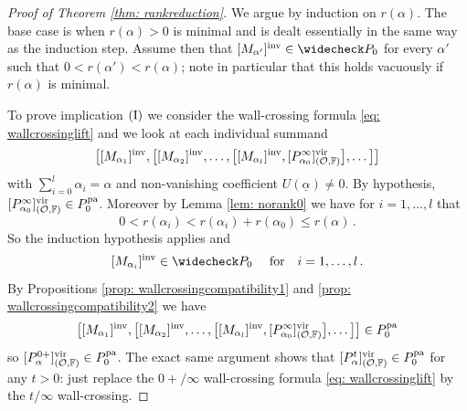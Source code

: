 \documentclass[a4paper, 12pt]{amsart}
\begin{document}
\begin{proof}[Proof of Theorem \ref{thm: rankreduction}]
We argue by induction on $r(\alpha)$. The base case is when $r(\alpha)>0$ is minimal and is dealt essentially in the same way as the induction step. Assume then that $[M_{\alpha'}]^\inva \in \widecheck P_0$ for every $\alpha'$ such that $0<r(\alpha')<r(\alpha)$; note in particular that this holds vacuously if $r(\alpha)$ is minimal. 

To prove implication $(\textup{I})$ we consider the wall-crossing formula \eqref{eq: wallcrossinglift} and we look at each individual summand 
\[\big[[M_{\alpha_1}]^{\mathrm{inv}},\big[[M_{\alpha_2}]^{\mathrm{inv}},\ldots, \big[[M_{\alpha_l}]^{\mathrm{inv}},[P_{\alpha_0}^\infty]^{\mathrm{vir}}_{({\mathcal O},{\mathbb{F}})}  \big],\ldots \big]\big]\]
with $\sum_{i=0}^l \alpha_i=\alpha$ and non-vanishing coefficient $U(\underline{\alpha})\neq 0$. By hypothesis, $[P_{\alpha_0}^\infty]^{\mathrm{vir}}_{({\mathcal O}, {\mathbb{F}})} \in P_{0}^{\mathop{\rm pa}\nolimits}$. Moreover by Lemma \ref{lem: norank0} we have for $i=1, \ldots, l$ that
\[0<r(\alpha_i)<r(\alpha_i)+r(\alpha_0)\leq r(\alpha)\,.\]
So the induction hypothesis applies and
\[[M_{\alpha_i}]^{\mathrm{inv}}\in \widecheck P_0\quad \textup{ for}\quad i=1, \ldots, l\,.\]
By Propositions \ref{prop: wallcrossingcompatibility1} and \ref{prop: wallcrossingcompatibility2} we have 
\[\big[[M_{\alpha_1}]^{\mathrm{inv}},\big[[M_{\alpha_2}]^{\mathrm{inv}},\ldots, \big[[M_{\alpha_l}]^{\mathrm{inv}},[P_{\alpha_0}^\infty]^{\mathrm{vir}}_{({\mathcal O},{\mathbb{F}})}  \big],\ldots \big]\big]\in P_{0}^{\mathop{\rm pa}\nolimits}\]
so $[P_\alpha^{0+}]^{\mathrm{vir}}_{({\mathcal O}, {\mathbb{F}})} \in P_{0}^{\mathop{\rm pa}\nolimits}$. The exact same argument shows that $[P_\alpha^{t}]^{\mathrm{vir}}_{({\mathcal O}, {\mathbb{F}})} \in P_{0}^{\mathop{\rm pa}\nolimits}$ for any $t>0$: just replace the ${0+}/\infty$ wall-crossing formula \eqref{eq: wallcrossinglift} by the $t/\infty$ wall-crossing. 


\end{proof}
\end{document}
